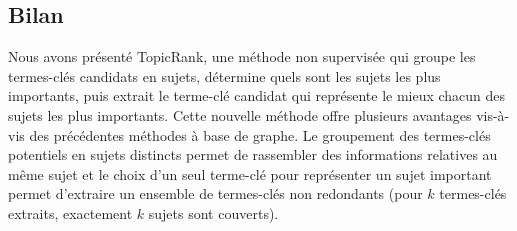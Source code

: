 
      \subsection{Bilan}
      \label{subsec:main:domain_independent_keyphrase_extraction-unsupervised_automatic_keyphrase_extraction-bilan}
        Nous avons présenté TopicRank, une méthode non supervisée qui groupe les
        termes-clés candidats en sujets, détermine quels sont les sujets les
        plus importants, puis extrait le terme-clé candidat qui représente le
        mieux chacun des sujets les plus importants. Cette nouvelle méthode
        offre plusieurs avantages vis-à-vis des précédentes méthodes à base de
        graphe. Le groupement des termes-clés potentiels en sujets distincts
        permet de rassembler des informations relatives au même sujet et le
        choix d'un seul terme-clé pour représenter un sujet important permet
        d'extraire un ensemble de termes-clés non redondants (pour $k$
        termes-clés extraits, exactement $k$ sujets sont couverts).


